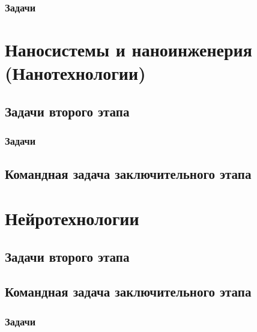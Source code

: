 \documentclass[a4paper,12pt,oneside]{book}
\begin{document}
\section{Задачи}


\part{Наносистемы и наноинженерия (Нанотехнологии)}
\clearpage
\chapter{Задачи второго этапа}
\section{Задачи}

\clearpage
\chapter{Командная задача заключительного этапа}


\part{Нейротехнологии}
\clearpage
\chapter{Задачи второго этапа}


\clearpage
\chapter{Командная задача заключительного этапа}
\section{Задачи}

\end{document}
